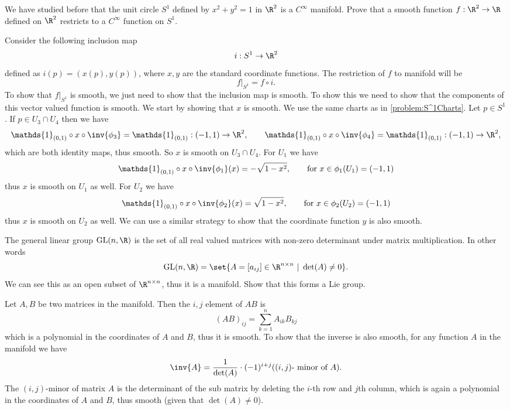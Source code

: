 \begin{problem}
	We have studied before that the unit circle $ S^1 $ defined by $ x^2 + y^2 = 1 $ in $ \R^2 $ is a $ C^\infty $ manifold. Prove that a smooth function $ f: \R^2 \to \R $ defined on $ \R^2 $ restricts to a $ C^\infty $ function on $ S^1 $.
\end{problem}

\begin{solution}
	Consider the following inclusion map
	\[ i: S^1 \to \R^2 \]
	defined as $ i(p) = (x(p),y(p)) $, where $ x,y $ are the standard coordinate functions. The restriction of $ f $ to manifold will be
	\[ f|_{S^1} = f \circ i. \]
	To show that $ f|_{S^1} $ is smooth, we just need to show that the inclusion map is smooth. To show this we need to show that the components of this vector valued function is smooth. We start by showing that $ x $ is smooth. We use the same charts as in \autoref{problem:S^1Charts}. Let $ p \in S^1 $. If $ p \in U_3 \cap U_4 $ then we have
	\[ \mathds{1}_{(0,1)}\circ x \circ \inv{\phi_3} = \mathds{1}_{(0,1)}: (-1,1) \to \R^2, \qquad \mathds{1}_{(0,1)}\circ x \circ \inv{\phi_4} = \mathds{1}_{(0,1)}: (-1,1) \to \R^2,  \]
	which are both identity maps, thus smooth. So $  x $ is smooth on $ U_3\cap U_4 $. For $ U_1 $ we have
	\[ \mathds{1}_{(0,1)}\circ x \circ \inv{\phi_1}(x) = -\sqrt{1-x^2}, \qquad\text{for } x \in \phi_1(U_1) = (-1,1) \]
	thus $ x $ is smooth on $ U_1 $ as well. For $ U_2 $ we have
	\[ \mathds{1}_{(0,1)}\circ x \circ \inv{\phi_2}(x) = \sqrt{1-x^2}, \qquad\text{for } x \in \phi_2(U_2) = (-1,1) \]
	thus $  x $ is smooth on $ U_2  $ as well. We can use a similar strategy to show that the coordinate function $ y $ is also smooth.
\end{solution}



\begin{problem}
	The general linear group $ \operatorname{GL}(n,\R) $ is the set of all real valued matrices with non-zero determinant under matrix multiplication. In other words
	\[ \operatorname{GL}(n,\R) = \set{A = \left[ a_{ij} \right] \in \R^{n\times n}\ |\ \det(A) \neq 0} . \]
	We can see this as an open subset of $ \R^{n\times n} $, thus it is a manifold. Show that this forms a Lie group.
\end{problem}

\begin{solution}
	Let $ A,B $ be two matrices in the manifold. Then the $ i,j $ element of $ AB $ is
	\[ (AB)_{ij} = \sum_{k=1}^{n} A_{ik}B_{kj} \]
	which is a polynomial in the coordinates of $ A $ and $ B $, thus it is smooth. To show that the inverse is also smooth, for any function $ A $ in the manifold we have
	\[ \inv{A} = \frac{1}{\det(A)} \cdot (-1)^{i+j}((i,j)\text{- minor of $ A $}). \]
	The $ (i,j)\text{-minor} $ of matrix $ A $ is the determinant of the sub matrix by deleting the $ i\text{-th} $ row and $ j\text{th} $ column, which is again a polynomial in the coordinates of $ A $ and $ B $, thus smooth (given that $ \det(A) \neq 0 $).
\end{solution}

